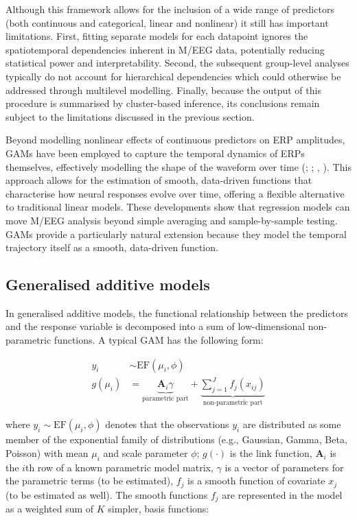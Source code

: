 \documentclass[
  doc,
  floatsintext,
  longtable,
  a4paper,
  nolmodern,
  notxfonts,
  notimes,
  colorlinks=true,linkcolor=blue,citecolor=blue,urlcolor=blue]{apa7}
\begin{document}
Although this framework allows for the inclusion of a wide range of
predictors (both continuous and categorical, linear and nonlinear) it
still has important limitations. First, fitting separate models for each
datapoint ignores the spatiotemporal dependencies inherent in M/EEG
data, potentially reducing statistical power and interpretability.
Second, the subsequent group-level analyses typically do not account for
hierarchical dependencies which could otherwise be addressed through
multilevel modelling. Finally, because the output of this procedure is
summarised by cluster-based inference, its conclusions remain subject to
the limitations discussed in the previous section.

Beyond modelling nonlinear effects of continuous predictors on ERP
amplitudes, GAMs have been employed to capture the temporal dynamics of
ERPs themselves, effectively modelling the shape of the waveform over
time (;
;
,
). This approach allows for the
estimation of smooth, data-driven functions that characterise how neural
responses evolve over time, offering a flexible alternative to
traditional linear models. These developments show that regression
models can move M/EEG analysis beyond simple averaging and
sample-by-sample testing. GAMs provide a particularly natural extension
because they model the temporal trajectory itself as a smooth,
data-driven function.

\subsection{Generalised additive
models}\label{generalised-additive-models}

In generalised additive models, the functional relationship between the
predictors and the response variable is decomposed into a sum of
low-dimensional non-parametric functions. A typical GAM has the
following form:

\[
\begin{aligned} 
y_{i} &\sim \mathrm{EF}\left(\mu_{i}, \phi\right)\\
g\left(\mu_i\right) &= \underbrace{\mathbf{A}_{i} \gamma}_{\text{parametric part}} + \underbrace{\sum_{j=1}^{J} f_{j}\left(x_{ij}\right)}_{\text{non-parametric part}}
\end{aligned}
\]

where \(y_{i} \sim \mathrm{EF}\left(\mu_{i}, \phi\right)\) denotes that
the observations \(y_{i}\) are distributed as some member of the
exponential family of distributions (e.g., Gaussian, Gamma, Beta,
Poisson) with mean \(\mu_{i}\) and scale parameter \(\phi\);
\(g(\cdot)\) is the link function, \(\mathbf{A}_{i}\) is the \(i\)th row
of a known parametric model matrix, \(\gamma\) is a vector of parameters
for the parametric terms (to be estimated), \(f_{j}\) is a smooth
function of covariate \(x_{j}\) (to be estimated as well). The smooth
functions \(f_{j}\) are represented in the model as a weighted sum of
\(K\) simpler, basis functions:
\end{document}
